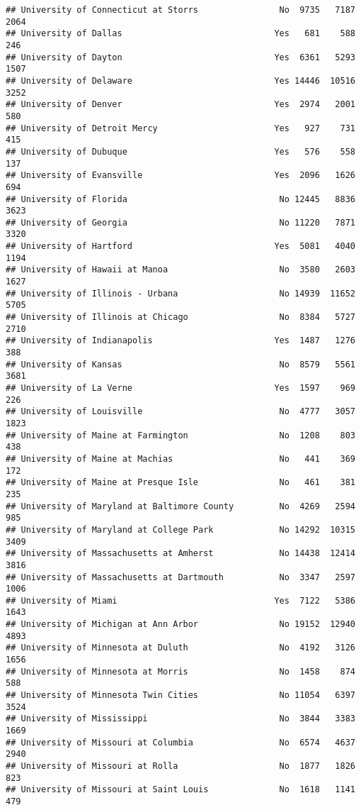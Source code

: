 \documentclass[
]{article}
\begin{document}
\begin{verbatim}
## University of Connecticut at Storrs                No  9735   7187   2064
## University of Dallas                              Yes   681    588    246
## University of Dayton                              Yes  6361   5293   1507
## University of Delaware                            Yes 14446  10516   3252
## University of Denver                              Yes  2974   2001    580
## University of Detroit Mercy                       Yes   927    731    415
## University of Dubuque                             Yes   576    558    137
## University of Evansville                          Yes  2096   1626    694
## University of Florida                              No 12445   8836   3623
## University of Georgia                              No 11220   7871   3320
## University of Hartford                            Yes  5081   4040   1194
## University of Hawaii at Manoa                      No  3580   2603   1627
## University of Illinois - Urbana                    No 14939  11652   5705
## University of Illinois at Chicago                  No  8384   5727   2710
## University of Indianapolis                        Yes  1487   1276    388
## University of Kansas                               No  8579   5561   3681
## University of La Verne                            Yes  1597    969    226
## University of Louisville                           No  4777   3057   1823
## University of Maine at Farmington                  No  1208    803    438
## University of Maine at Machias                     No   441    369    172
## University of Maine at Presque Isle                No   461    381    235
## University of Maryland at Baltimore County         No  4269   2594    985
## University of Maryland at College Park             No 14292  10315   3409
## University of Massachusetts at Amherst             No 14438  12414   3816
## University of Massachusetts at Dartmouth           No  3347   2597   1006
## University of Miami                               Yes  7122   5386   1643
## University of Michigan at Ann Arbor                No 19152  12940   4893
## University of Minnesota at Duluth                  No  4192   3126   1656
## University of Minnesota at Morris                  No  1458    874    588
## University of Minnesota Twin Cities                No 11054   6397   3524
## University of Mississippi                          No  3844   3383   1669
## University of Missouri at Columbia                 No  6574   4637   2940
## University of Missouri at Rolla                    No  1877   1826    823
## University of Missouri at Saint Louis              No  1618   1141    479

\end{verbatim}
\end{document}
